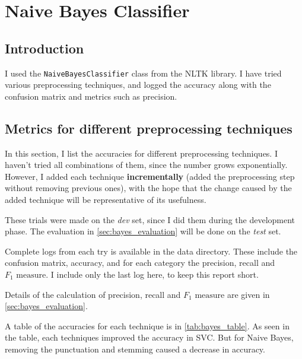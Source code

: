 \section{Naive Bayes Classifier}
\label{sec:bayes}

\subsection{Introduction}

I used the \texttt{NaiveBayesClassifier} class from the NLTK library. I have tried various preprocessing techniques, and logged the accuracy along with the confusion matrix and metrics such as precision.

\subsection{Metrics for different preprocessing techniques}

In this section, I list the accuracies for different preprocessing techniques. I haven't tried all combinations of them, since the number grows exponentially. However, I added each technique \textbf{incrementally} (added the preprocessing step without removing previous ones), with the hope that the change caused by the added technique will be representative of its usefulness.

These trials were made on the \emph{dev} set, since I did them during the development phase. The evaluation in \autoref{sec:bayes_evaluation} will be done on the \emph{test} set.

Complete logs from each try is available in the data directory. These include the confusion matrix, accuracy, and for each category the precision, recall and $F_1\text{ measure}$. I include only the last log here, to keep this report short.

Details of the calculation of precision, recall and $F_1\text{ measure}$ are given in \autoref{sec:bayes_evaluation}.

A table of the accuracies for each technique is in \autoref{tab:bayes_table}. As seen in the table, each techniques improved the accuracy in SVC. But for Naive Bayes, removing the punctuation and stemming caused a decrease in accuracy.

